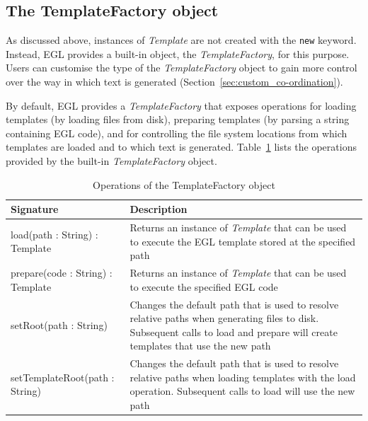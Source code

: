 \subsection{The TemplateFactory object}
As discussed above, instances of \emph{Template} are not created with the \texttt{new} keyword. Instead, EGL provides a built-in object, the \emph{TemplateFactory}, for this purpose. Users can customise the type of the \emph{TemplateFactory} object to gain more control over the way in which text is generated (Section~\ref{sec:custom_co-ordination}).

By default, EGL provides a \emph{TemplateFactory} that exposes operations for loading templates (by loading files from disk), preparing templates (by parsing a string containing EGL code), and for controlling the file system locations from which templates are loaded and to which text is generated. Table~\ref{tab:TemplateFactoryOperations} lists the operations provided by the built-in \emph{TemplateFactory} object. 

\label{sec:template_factory}
\begin{longtable} {|p{5.5cm}|p{6.5cm}|}
			
			\caption{Operations of the TemplateFactory object}
			\label{tab:TemplateFactoryOperations}\\
			
			\hline
							
			\textbf{Signature} & \textbf{Description} \\\hline
			
			load(path : String) : Template & Returns an instance of \emph{Template} that can be used to execute the EGL template stored at the specified path  \\\hline
			
			prepare(code : String) : Template & Returns an instance of \emph{Template} that can be used to execute the specified EGL code  \\\hline
			
			setRoot(path : String) & Changes the default path that is used to resolve relative paths when generating files to disk. Subsequent calls to load and prepare will create templates that use the new path \\\hline
			
			setTemplateRoot(path : String) & Changes the default path that is used to resolve relative paths when loading templates with the load operation. Subsequent calls to load will use the new path \\\hline
\end{longtable}

